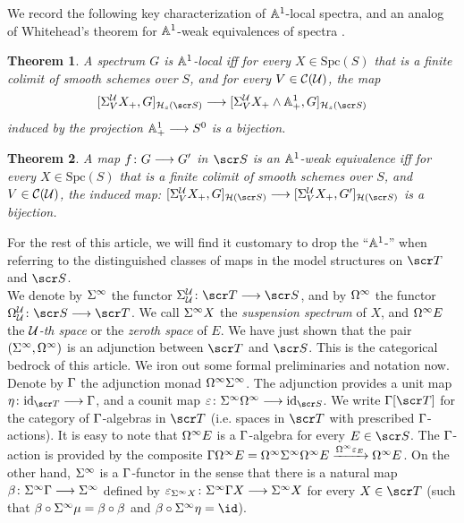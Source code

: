 \documentclass{amsart}
\newtheorem{thm}{Theorem}[section]
\theoremstyle{definition}
\begin{document}
We record the following key characterization of $\mathbb{A}^1$-local spectra, and an analog of Whitehead's theorem for $\mathbb{A}^1$-weak equivalences of spectra \cite[Lemma 6.12 and Proposition 6.13]{Hu03}.

\begin{thm}
A spectrum $G$ is $\mathbb{A}^1$-local iff for every $X \in \mathrm{Spc}(S)$ that is a finite colimit of smooth schemes over $S$, and for every $V \in {\mathcal{C}}({\mathcal{U}})$, the map \[[\SI^{\oU}_V X_+, G]_{\oH_s(\sS)} \rtarr [\SI^{\oU}_{V}X_+ \wedge \bA^1_+, G]_{\oH_s(\sS)}\] \noindent induced by the projection $\mathbb{A}^1_+ \longrightarrow S^0$ is a bijection.
\end{thm}

\begin{thm}\label{thm:2.2}
A map $f \colon G \longrightarrow G'$ in $\sS$ is an $\mathbb{A}^1$-weak equivalence iff for every $X \in \mathrm{Spc}(S)$ that is a finite colimit of smooth schemes over $S$, and $V \in {\mathcal{C}}({\mathcal{U}})$, the induced map: $[\SI^{\oU}_V X_+, G]_{\oH(\sS)} \rtarr [\SI^{\oU}_V X_+, G']_{\oH(\sS)}$ is a bijection.
\end{thm}

\noindent For the rest of this article, we will find it customary to drop the ``$\mathbb{A}^1$-'' when referring to the distinguished classes of maps in the model structures on $\sT$ and $\sS$.\\

We denote by $\Sigma^{\infty}$ the functor $\SI^{\oU}_{\oU} \colon \sT \rtarr \sS$, and by $\Omega^{\infty}$ the functor $\OM^{\oU}_{\oU} \colon \sS \rtarr \sT$. We call $\Sigma^{\infty} X$ the \emph{suspension spectrum} of $X$, and $\Omega^{\infty}E$ the \emph{${\mathcal{U}}$-th space} or the \emph{zeroth space} of $E$. We have just shown that the pair $(\Sigma^{\infty},\Omega^{\infty})$ is an adjunction between $\sT$ and $\sS$. This is the categorical bedrock of this article. We iron out some formal preliminaries and notation now. Denote by $\Gamma$ the adjunction monad $\Omega^{\infty}\Sigma^{\infty}$. The adjunction provides a unit map $\eta \colon \mathrm{id}_{\sT} \rtarr \GA$, and a counit map $\epz \colon \SI^{\infty}\OM^{\infty} \rtarr \mathrm{id}_{\sS}$. We write $\GA[\sT]$ for the category of $\Gamma$-algebras in $\sT$ (i.e. spaces in $\sT$ with prescribed $\Gamma$-actions). It is easy to note that $\Omega^{\infty} E$ is a $\Gamma$-algebra for every $E \in \sS$. The $\Gamma$-action is provided by the composite $\Gamma \Omega^{\infty} E = \Omega^{\infty} \Sigma^{\infty} \Omega^{\infty} E \xrightarrow{\Omega^{\infty}\varepsilon_E} \Omega^{\infty}E$. On the other hand, $\Sigma^{\infty}$ is a $\Gamma$-functor in the sense that there is a natural map $\beta \colon \Sigma^{\infty} \Gamma \longrightarrow \Sigma^{\infty}$ defined by $\varepsilon_{\Sigma^{\infty}X} \colon \Sigma^{\infty} \Gamma X \longrightarrow \Sigma^{\infty} X$ for every $X \in \sT$ (such that $\beta \circ \Sigma^{\infty}\mu = \beta \circ \beta$ and $\be \circ \SI^{\infty}\et = \id$).
\end{document}
